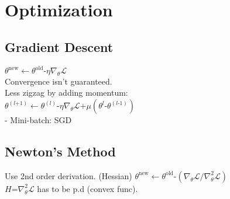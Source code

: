 

\section*{Optimization}
\subsection*{Gradient Descent}
$\theta^{\mathrm{new}}\leftarrow\theta^{\mathrm{old}}\text{-}\eta\nabla_{\theta}\mathcal{L}$\\
Convergence isn't guaranteed.\\
Less zigzag by adding momentum: \\$\theta^{(l\text{+}1)}\leftarrow\theta^{(l)}\text{-}\eta\nabla_{\theta}\mathcal{L}\text{+}\mu(\theta^{l}\text{-}\theta^{(l\text{-}1)})$\\
- Mini-batch: SGD
\subsection*{Newton's Method}
Use 2nd order derivation. (Hessian)
$\theta^{\mathrm{new}}\leftarrow\theta^{\mathrm{old}}\text{-}(\nabla_{\theta}\mathcal{L}/\nabla^2_{\theta}\mathcal{L})$\\
$H\text{=}\nabla^2_{\theta}\mathcal{L}$ has to be p.d (convex func).

